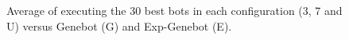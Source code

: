 \begin{figure}
\centering

 \newline
{}
\caption{Average of executing the 30 best bots in each configuration (3, 7 and U) versus Genebot (G) and Exp-Genebot (E).}

\label{fig:victories}
\end{figure}

